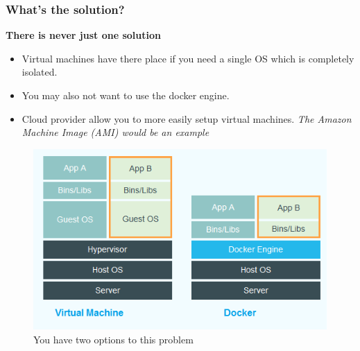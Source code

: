 \documentclass{beamer}
\begin{document}
\begin{frame}
\frametitle{What's the solution?}
\small
\textbf{There is never just one solution}
\begin{itemize}
    \item Virtual machines have there place if you need a single OS which is completely isolated.
    \item You may also not want to use the docker engine.
    \item Cloud provider allow you to more easily setup virtual machines. \textit{The Amazon Machine Image (AMI) would be an example}
\end{itemize}
\begin{figure}
    \includegraphics[scale=0.40]{./pics/container_vs_vm.png}
    \caption{You have two options to this problem}
\end{figure}
\end{frame}

\end{document}
